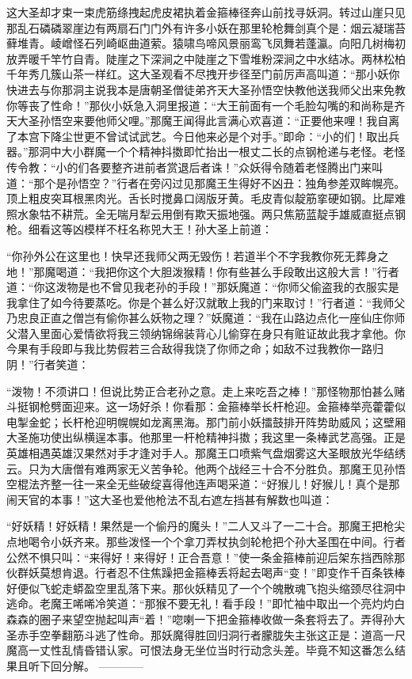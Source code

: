 \documentclass[12pt,UTF8]{ctexbook}
\begin{document}
这大圣却才束一束虎筋绦拽起虎皮裙执着金箍棒径奔山前找寻妖洞。转过山崖只见那乱石磷磷翠崖边有两扇石门门外有许多小妖在那里轮枪舞剑真个是：烟云凝瑞苔藓堆青。崚嶒怪石列崎岖曲道萦。猿啸鸟啼风景丽鸾飞凤舞若蓬瀛。向阳几树梅初放弄暖千竿竹自青。陡崖之下深涧之中陡崖之下雪堆粉深涧之中水结冰。两林松柏千年秀几簇山茶一样红。这大圣观看不尽拽开步径至门前厉声高叫道：“那小妖你快进去与你那洞主说我本是唐朝圣僧徒弟齐天大圣孙悟空快教他送我师父出来免教你等丧了性命！”那伙小妖急入洞里报道：“大王前面有一个毛脸勾嘴的和尚称是齐天大圣孙悟空来要他师父哩。”那魔王闻得此言满心欢喜道：“正要他来哩！我自离了本宫下降尘世更不曾试试武艺。今日他来必是个对手。”即命：“小的们！取出兵器。”那洞中大小群魔一个个精神抖擞即忙抬出一根丈二长的点钢枪递与老怪。老怪传令教：“小的们各要整齐进前者赏退后者诛！”众妖得令随着老怪腾出门来叫道：“那个是孙悟空？”行者在旁闪过见那魔王生得好不凶丑：独角参差双眸幌亮。顶上粗皮突耳根黑肉光。舌长时搅鼻口阔版牙黄。毛皮青似靛筋挛硬如钢。比犀难照水象牯不耕荒。全无喘月犁云用倒有欺天振地强。两只焦筋蓝靛手雄威直挺点钢枪。细看这等凶模样不枉名称兕大王！孙大圣上前道：

“你孙外公在这里也！快早还我师父两无毁伤！若道半个不字我教你死无葬身之地！”那魔喝道：“我把你这个大胆泼猴精！你有些甚么手段敢出这般大言！”行者道：“你这泼物是也不曾见我老孙的手段！”那妖魔道：“你师父偷盗我的衣服实是我拿住了如今待要蒸吃。你是个甚么好汉就敢上我的门来取讨！”行者道：“我师父乃忠良正直之僧岂有偷你甚么妖物之理？”妖魔道：“我在山路边点化一座仙庄你师父潜入里面心爱情欲将我三领纳锦绵装背心儿偷穿在身只有赃证故此我才拿他。你今果有手段即与我比势假若三合敌得我饶了你师之命；如敌不过我教你一路归阴！”行者笑道：

“泼物！不须讲口！但说比势正合老孙之意。走上来吃吾之棒！”那怪物那怕甚么赌斗挺钢枪劈面迎来。这一场好杀！你看那：金箍棒举长杆枪迎。金箍棒举亮藿藿似电掣金蛇；长杆枪迎明幌幌如龙离黑海。那门前小妖擂鼓排开阵势助威风；这壁厢大圣施功使出纵横逞本事。他那里一杆枪精神抖擞；我这里一条棒武艺高强。正是英雄相遇英雄汉果然对手才逢对手人。那魔王口喷紫气盘烟雾这大圣眼放光华结绣云。只为大唐僧有难两家无义苦争轮。他两个战经三十合不分胜负。那魔王见孙悟空棍法齐整一往一来全无些破绽喜得他连声喝采道：“好猴儿！好猴儿！真个是那闹天官的本事！”这大圣也爱他枪法不乱右遮左挡甚有解数也叫道：

“好妖精！好妖精！果然是一个偷丹的魔头！”二人又斗了一二十合。那魔王把枪尖点地喝令小妖齐来。那些泼怪一个个拿刀弄杖执剑轮枪把个孙大圣围在中间。行者公然不惧只叫：“来得好！来得好！正合吾意！”使一条金箍棒前迎后架东挡西除那伙群妖莫想肯退。行者忍不住焦躁把金箍棒丢将起去喝声“变！”即变作千百条铁棒好便似飞蛇走蟒盈空里乱落下来。那伙妖精见了一个个魄散魂飞抱头缩颈尽往洞中逃命。老魔王唏唏冷笑道：“那猴不要无礼！看手段！”即忙袖中取出一个亮灼灼白森森的圈子来望空抛起叫声“着！”唿喇一下把金箍棒收做一条套将去了。弄得孙大圣赤手空拳翻筋斗逃了性命。那妖魔得胜回归洞行者朦胧失主张这正是：道高一尺魔高一丈性乱情昏错认家。可恨法身无坐位当时行动念头差。毕竟不知这番怎么结果且听下回分解。
------------
\end{document}
